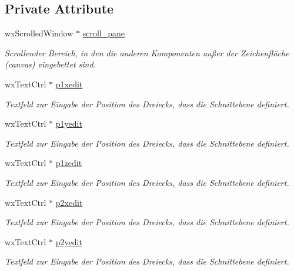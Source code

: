 \subsection*{Private Attribute}
\begin{DoxyCompactItemize}
\item 
wx\-Scrolled\-Window $\ast$ \hyperlink{classGUICutRenderWindow_a28c430f7145860ba3265fa9b8417923d}{scroll\-\_\-pane}
\begin{DoxyCompactList}\small\item\em Scrollender Bereich, in den die anderen Komponenten außer der Zeichenfläche (canvas) eingebettet sind. \end{DoxyCompactList}\item 
wx\-Text\-Ctrl $\ast$ \hyperlink{classGUICutRenderWindow_a509b5ca573c287e3863e952ec629fa7b}{p1xedit}
\begin{DoxyCompactList}\small\item\em Textfeld zur Eingabe der Position des Dreiecks, dass die Schnittebene definiert. \end{DoxyCompactList}\item 
wx\-Text\-Ctrl $\ast$ \hyperlink{classGUICutRenderWindow_a93e837c15d8c6e7f420fd457c49024f2}{p1yedit}
\begin{DoxyCompactList}\small\item\em Textfeld zur Eingabe der Position des Dreiecks, dass die Schnittebene definiert. \end{DoxyCompactList}\item 
wx\-Text\-Ctrl $\ast$ \hyperlink{classGUICutRenderWindow_a5843efcb13e1d56ea95932d052e5666a}{p1zedit}
\begin{DoxyCompactList}\small\item\em Textfeld zur Eingabe der Position des Dreiecks, dass die Schnittebene definiert. \end{DoxyCompactList}\item 
wx\-Text\-Ctrl $\ast$ \hyperlink{classGUICutRenderWindow_a5d2bcd96c6fdb8d629583c5d40ccdbcc}{p2xedit}
\begin{DoxyCompactList}\small\item\em Textfeld zur Eingabe der Position des Dreiecks, dass die Schnittebene definiert. \end{DoxyCompactList}\item 
wx\-Text\-Ctrl $\ast$ \hyperlink{classGUICutRenderWindow_a8ec4550ec7d30a8ad3c4c1e5dfcb8dce}{p2yedit}
\begin{DoxyCompactList}\small\item\em Textfeld zur Eingabe der Position des Dreiecks, dass die Schnittebene definiert. \end{DoxyCompactList}\item 

\end{DoxyCompactItemize}
